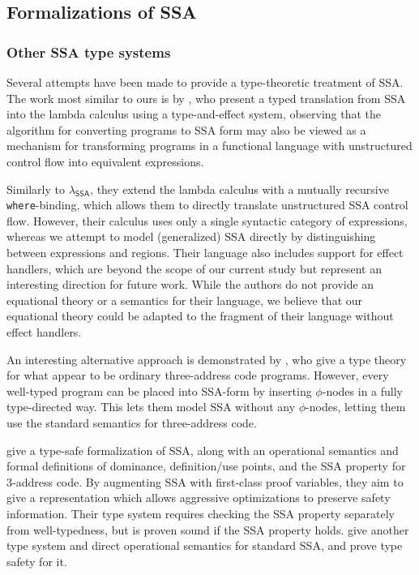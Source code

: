 \documentclass[acmsmall,screen,review]{acmart}
\newcommand{\ms}[1]{\ensuremath{\mathsf{#1}}}
\newcommand{\isotopessa}{\(\lambda_{\ms{SSA}}\)}
\begin{document}
\subsection{Formalizations of SSA}

\subsubsection{Other SSA type systems}

Several attempts have been made to provide a type-theoretic treatment of SSA. The work most similar
to ours is by \citet{typed-effect-ssa-rigon-torrens-vasconcellos-20}, who present a typed
translation from SSA into the lambda calculus using a type-and-effect system, observing that the
algorithm for converting programs to SSA form may also be viewed as a mechanism for transforming
programs in a functional language with unstructured control flow into equivalent expressions.

Similarly to \isotopessa{}, they extend the lambda calculus with a mutually recursive
\texttt{where}-binding, which allows them to directly translate unstructured SSA control flow.
However, their calculus uses only a single syntactic category of expressions, whereas we attempt to
model (generalized) SSA directly by distinguishing between expressions and regions. Their language
also includes support for effect handlers, which are beyond the scope of our current study but
represent an interesting direction for future work. While the authors do not provide an equational
theory or a semantics for their language, we believe that our equational theory could be adapted to
the fragment of their language without effect handlers.

An interesting alternative approach is demonstrated by \citet{ssa-types-matsuno-ohori-06}, who give
a type theory for what appear to be ordinary three-address code programs. However, every well-typed
program can be placed into SSA-form by inserting $\phi$-nodes in a fully type-directed way. This
lets them model SSA without any $\phi$-nodes, letting them use the standard semantics for
three-address code. 

\citet{menon-verified-06} give a type-safe formalization of SSA, along with an operational semantics
and  formal definitions of dominance, definition/use points, and the SSA property for 3-address
code. By augmenting SSA with first-class proof variables, they aim to give a representation which
allows aggressive optimizations to preserve safety information. Their type system requires checking
the SSA property separately from well-typedness, but is proven sound if the SSA property holds.
\citet{hua-explicit-ssa-2010} give another type system and direct operational semantics for standard
SSA, and prove type safety for it.
\end{document}

